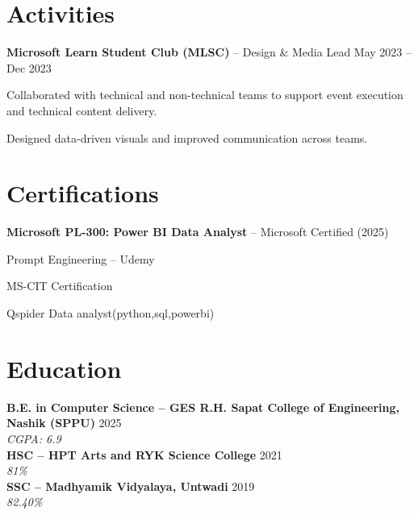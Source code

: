 \documentclass[letterpaper,10pt]{article}
\newenvironment{resume_list}{
  \vspace{-4pt}
  \begin{itemize}[leftmargin=18pt, itemsep=-3pt]
}{
  \end{itemize}
}
\begin{document}

\section*{Activities}
\textbf{Microsoft Learn Student Club (MLSC)} – Design \& Media Lead \hfill May 2023 -- Dec 2023
\begin{resume_list}
  \item Collaborated with technical and non-technical teams to support event execution and technical content delivery.
  \item Designed data-driven visuals and improved communication across teams.
\end{resume_list}



\section*{Certifications}
\begin{resume_list}
  \item \textbf{Microsoft PL-300: Power BI Data Analyst} – Microsoft Certified (2025)
  \item Prompt Engineering – Udemy
  \item MS-CIT Certification
  \item Qspider Data analyst(python,sql,powerbi)
\end{resume_list}


\section*{Education}

\textbf{B.E. in Computer Science – GES R.H. Sapat College of Engineering, Nashik (SPPU)} \hfill 2025 \\
\textit{CGPA: 6.9} \\[-2pt]

\textbf{HSC – HPT Arts and RYK Science College} \hfill 2021 \\
\textit{81\%} \\[-2pt]

\textbf{SSC – Madhyamik Vidyalaya, Untwadi} \hfill 2019 \\
\textit{82.40\%}
\end{document}
